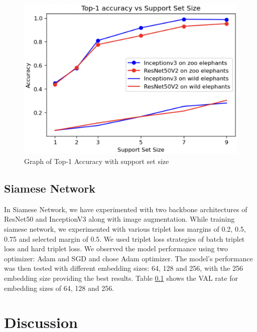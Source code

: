 \documentclass[10pt,twocolumn,letterpaper]{article}
\begin{document}
\begin{figure}[t]
  \centering
  \includegraphics[scale=0.45]{few_shot_graph}
   \caption{Graph of Top-1 Accuracy with support set size}
   \label{fig:few_shot_graph}
\end{figure}

\subsection{Siamese Network}

In Siamese Network, we have  experimented with two backbone architectures of ResNet50 and InceptionV3 along with image augmentation. While training siamese network, we experimented with various triplet loss margins of 0.2, 0.5, 0.75 and selected margin of 0.5. We used triplet loss strategies of batch triplet loss and hard triplet loss. We observed the model performance using two optimizer: Adam and SGD and chose Adam optimizer. The model's performance was then tested with different embedding sizes: 64, 128 and 256, with the 256 embedding size providing the best results. Table \ref{} shows the VAL rate for embedding sizes of 64, 128 and 256.


\section{Discussion}
\label{sec:discussion}





\end{document}
